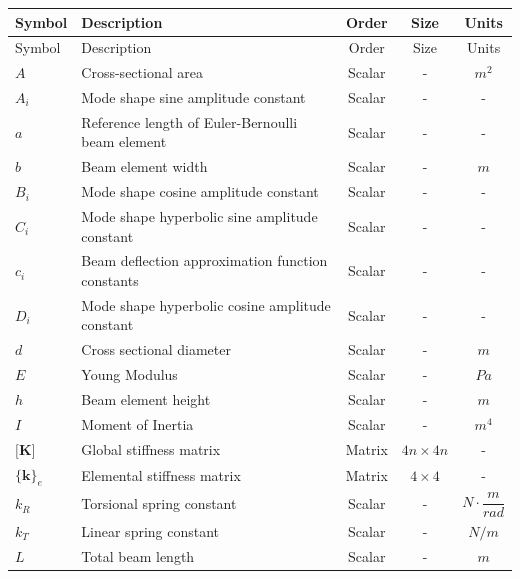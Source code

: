 \makeatletter
    \setlength{\absparsep}{18pt}
\makeatother

\begin{center}
    \textbf{\variablestitle}
\end{center}
\vspace{.5cm}

\begin{longtable}{llccc}

\hline
Symbol & Description & Order & Size & Units\\
\hline
\endfirsthead

\hline
Symbol & Description & Order & Size & Units\\
\hline
\endhead

\hline
\endfoot

\hline
\endlastfoot
    $A$     & Cross-sectional area & Scalar & - & $m^2$ \\
    $A_i$   & Mode shape sine amplitude constant & Scalar & - & - \\
    $a$     & Reference length of Euler-Bernoulli beam element & Scalar & - & - \\
    $b$     & Beam element width & Scalar & - & $m$ \\
    $B_i$   & Mode shape cosine amplitude constant & Scalar & - & - \\
    $C_i$   & Mode shape hyperbolic sine amplitude constant & Scalar & - & - \\
    $c_i$   & Beam deflection approximation function constants & Scalar & - & - \\
    $D_i$   & Mode shape hyperbolic cosine amplitude constant & Scalar & - & - \\
    $d$     & Cross sectional diameter & Scalar & - & $m$ \\
    $E$     & Young Modulus & Scalar & - & $Pa$ \\
    $h$     & Beam element height & Scalar & - & $m$ \\
    $I$     & Moment of Inertia & Scalar & - & $m^4$ \\
    $\textbf{[K]}$
            & Global stiffness matrix & Matrix & $4n\times 4n$ & - \\
    $\{\textbf{k}\}_e$
            & Elemental stiffness matrix & Matrix & $4\times 4$ & - \\
    $k_R$   & Torsional spring constant & Scalar & - & $N\cdot \dfrac{m}{rad}$ \\
    $k_T$   & Linear spring constant & Scalar & - & $N/m$ \\
    $L$     & Total beam length & Scalar & - & $m$ \\

\end{longtable}
